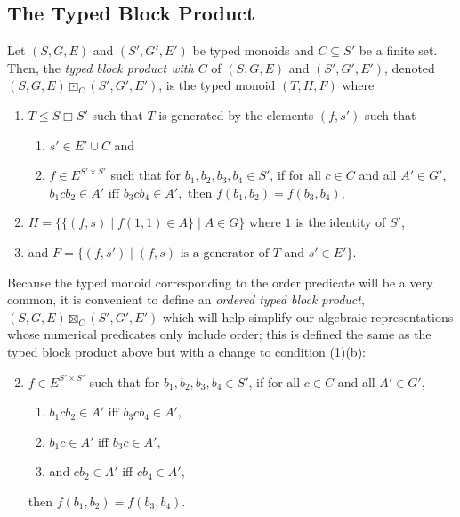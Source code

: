 \documentclass[a4paper,UKenglish,cleveref, autoref, thm-restate, anonymous]{lipics-v2021}
\begin{document}
\subsection{The Typed Block Product}

\begin{definition}\label{def:typedblockproduct}
    Let $(S, G, E)$ and $(S', G', E')$ be typed monoids and $C \subseteq S'$ be a finite set. Then, the \emph{typed block product with $C$} of $(S, G, E)$ and $(S', G', E')$, denoted $(S, G, E) \boxdot_C (S', G', E')$, is the typed monoid $(T, H, F)$ where
    \begin{enumerate}[\ \ \ \ (1)]
        \item $T \leq S \Box S'$ such that $T$ is generated by the elements $(f,s')$ such that
        \begin{enumerate}[\ \ \ \ (a)]
            \item $s' \in E' \cup C$ and
            \item $f \in E^{S' \times S'}$ such that for $b_1,b_2,b_3,b_4 \in S'$, if for all $c \in C$ and all $A' \in G'$, \(
                b_1cb_2 \in A' \text{ iff } b_3cb_4 \in A',
            \) then $f(b_1,b_2) = f(b_3,b_4)$,
        \end{enumerate}
        \item $H = \{\{(f,s) \mid f(1,1) \in A\} \mid A \in G\}$ where $1$ is the identity of $S'$,
        \item and $F = \{(f,s') \mid \text{$(f,s)$ is a generator of $T$ and } s' \in E'\}$.
    \end{enumerate}
\end{definition}
\begin{definition}\label{def:orderedtypedblockproduct}
    Because the typed monoid corresponding to the order predicate will be a very common, it is convenient to define an \emph{ordered typed block product}, $(S, G, E) \boxtimes_C (S', G', E')$ which will help simplify our algebraic representations whose numerical predicates only include order; this is defined the same as the typed block product above but with a change to condition (1)(b):
    \begin{enumerate}[\ \ \ \ {(1)}(b${}_<$)]
        \setcounter{enumi}{1}
        \item $f \in E^{S' \times S'}$ such that for $b_1,b_2,b_3,b_4 \in S'$, if for all $c \in C$ and all $A' \in G'$,
        \begin{enumerate}[\ \ \ \ (i)]
            \item $b_1cb_2 \in A'$ iff $b_3cb_4 \in A'$,
            \item $b_1c \in A'$ iff $b_3c \in A'$,
            \item and $cb_2 \in A'$ iff $cb_4 \in A'$,
        \end{enumerate}
        then $f(b_1,b_2) = f(b_3,b_4)$.
    \end{enumerate}
\end{definition}
\end{document}
